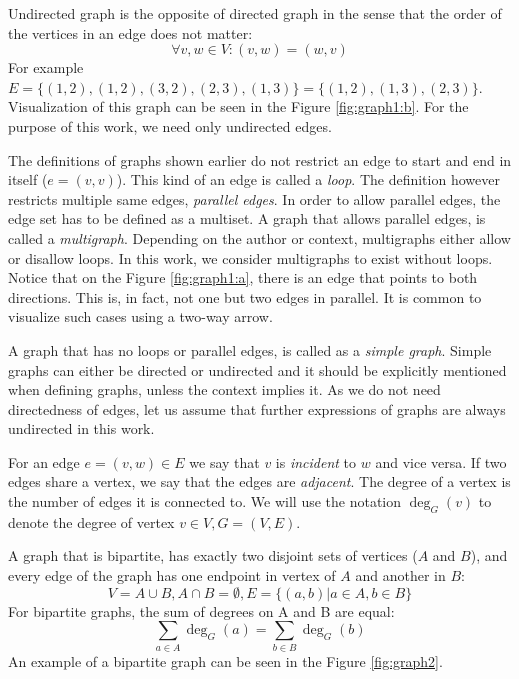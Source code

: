 Undirected graph is the opposite of directed graph in the sense that the order of the vertices in an edge does not matter:
\begin{equation}
\forall v, w \in V: (v, w) = (w, v)
\end{equation}
For example $E=\{(1, 2), (1, 2), (3, 2), (2, 3), (1, 3)\}=\{(1,2),(1,3),(2,3)\}$.
Visualization of this graph can be seen in the Figure \ref{fig:graph1:b}.
For the purpose of this work, we need only undirected edges.

The definitions of graphs shown earlier do not restrict an edge to start and end in itself ($e=(v, v)$).
This kind of an edge is called a \emph{loop}.
The definition however restricts multiple same edges, \emph{parallel edges}.
In order to allow parallel edges, the edge set has to be defined as a multiset.
A graph that allows parallel edges, is called a \emph{multigraph}.
Depending on the author or context, multigraphs either allow or disallow loops.
In this work, we consider multigraphs to exist without loops.
Notice that on the Figure \ref{fig:graph1:a}, there is an edge that points to both directions.
This is, in fact, not one but two edges in parallel.
It is common to visualize such cases using a two-way arrow.

A graph that has no loops or parallel edges, is called as a \emph{simple graph}.
Simple graphs can either be directed or undirected and it should be explicitly mentioned when defining graphs, unless the context implies it.
As we do not need directedness of edges, let us assume that further expressions of graphs are always undirected in this work.

For an edge $e=(v, w) \in E$ we say that $v$ is \emph{incident} to $w$ and vice versa.
If two edges share a vertex, we say that the edges are \emph{adjacent}.
The degree of a vertex is the number of edges it is connected to.
We will use the notation $\deg_G(v)$ to denote the degree of vertex $v \in V, G=(V,E)$.

A graph that is bipartite, has exactly two disjoint sets of vertices ($A$ and $B$), and every edge of the graph has one endpoint in vertex of $A$ and another in $B$:
\begin{equation}
V = A \cup B, A \cap B = \emptyset, E=\{(a, b) | a \in A, b \in B\}
\end{equation}
For bipartite graphs, the sum of degrees on A and B are equal:
\begin{equation}
\sum_{a\in A} \deg_G(a) = \sum_{b\in B} \deg_G(b)
\end{equation}
An example of a bipartite graph can be seen in the Figure \ref{fig:graph2}.

